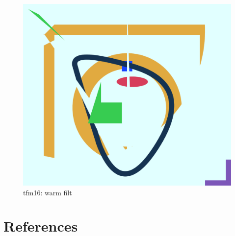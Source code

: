\documentclass[12pt]{article}
\begin{document}
\begin{figure}[h]
\begin{minipage}[b]{0.3\textwidth}
	\end{minipage}
	\hfill
	\begin{minipage}[b]{0.3\textwidth}
		\includegraphics[width=\textwidth]{./pdf/main-test-out-16.pdf}
		\caption{tfm16: warm filt}
	\end{minipage}
\end{figure}
\vfill
\vspace{20px}

\pagebreak
\section{References}
\end{document}
